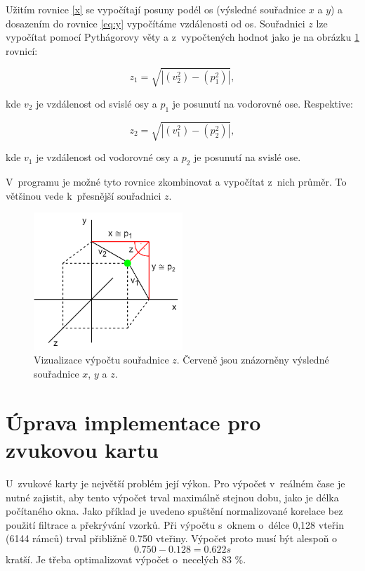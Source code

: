 Užitím rovnice \ref{x} se vypočítají posuny podél os (výsledné souřadnice $x$ a $y$) a dosazením do rovnice \ref{eq:y} vypočítáme vzdálenosti od os. Souřadnici $z$ lze vypočítat pomocí Pythágorovy věty a z~vypočtených hodnot jako je na obrázku \ref{pic:vypocetz} rovnicí:

\begin{equation}
    z_1 = \sqrt{ |(v_2^2)-(p_1^2)| },
\end{equation}

kde $v_2$ je vzdálenost od svislé osy a $p_1$ je posunutí na vodorovné ose.
Respektive:

\begin{equation}
    z_2 = \sqrt{ |(v_1^2)-(p_2^2)| },
\end{equation}

kde $v_1$ je vzdálenost od vodorovné osy a $p_2$ je posunutí na svislé ose.

V~programu je možné tyto rovnice zkombinovat a vypočítat z~nich průměr. To většinou vede k~přesnější souřadnici $z$.

\begin{figure}[h]
	\centering
	\includegraphics[width=0.5\textwidth]{obrazky-figures/spojeni_x_a_z.png}
	\caption{Vizualizace výpočtu souřadnice $z$. Červeně jsou znázorněny výsledné souřadnice $x$, $y$ a $z$.}
	\label{pic:vypocetz}
\end{figure}

\section{Úprava implementace pro zvukovou kartu}

U~zvukové karty je největší problém její výkon. Pro výpočet v~reálném čase je nutné zajistit, aby tento výpočet trval maximálně stejnou dobu, jako je délka počítaného okna. Jako příklad je uvedeno spuštění normalizované korelace bez použití filtrace a překrývání vzorků. Při výpočtu s~oknem o~délce 0,128 vteřin (6144 rámců) trval přibližně 0.750 vteřiny. Výpočet proto musí být alespoň o~$$0.750-0.128=0.622 s$$ kratší. Je třeba optimalizovat výpočet o~necelých 83 \%.

